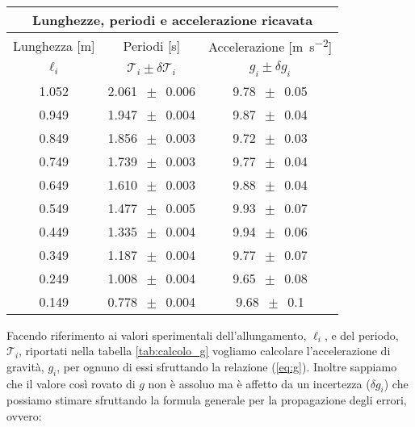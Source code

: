 \begin{SCtable}
    \centering
    \begin{tabular}{c c c}
        \multicolumn{3}{c}{\textbf{Lunghezze, periodi e accelerazione ricavata}} \\
        \toprule
        Lunghezza [\si{\metre}] & Periodi [\si{\second}] & Accelerazione [\si{\metre\per\square\second}] \\ %
        $\ell_i$ & $\mathcal{T}_i \pm \delta\mathcal{T}_i$ & $g_i \pm \delta g_i$ \\
        \midrule
			1.052 & 2.061 $\,\pm\,$ 0.006 & 9.78 $\,\pm\,$ 0.05 \\
			0.949 & 1.947 $\,\pm\,$ 0.004 & 9.87 $\,\pm\,$ 0.04 \\
			0.849 & 1.856 $\,\pm\,$ 0.003 & 9.72 $\,\pm\,$ 0.03 \\
			0.749 & 1.739 $\,\pm\,$ 0.003 & 9.77 $\,\pm\,$ 0.04 \\
			0.649 & 1.610 $\,\pm\,$ 0.003 & 9.88 $\,\pm\,$ 0.04 \\
			0.549 & 1.477 $\,\pm\,$ 0.005 & 9.93 $\,\pm\,$ 0.07 \\
			0.449 & 1.335 $\,\pm\,$ 0.004 & 9.94 $\,\pm\,$ 0.06 \\
			0.349 & 1.187 $\,\pm\,$ 0.004 & 9.77 $\,\pm\,$ 0.07 \\
			0.249 & 1.008 $\,\pm\,$ 0.004 & 9.65 $\,\pm\,$ 0.08 \\
			0.149 & 0.778 $\,\pm\,$ 0.004 & 9.68 $\,\pm\,$ 0.1 \\
        \bottomrule
    \end{tabular}
    \caption{In questa tebella sono riportate nella prima colonna le misure della lunghezza del filo che sono tutte affette da un'incertezza di 0.0006 m ricavata nel paragrafo precedente al punto \ref{l_medie}. Nella seconda colonna sono riportati i valori medi del periodo di oscillazione del pendolo relativo a ciascuna lunghezza. Infine nella terza colonna sono riportati i valori di $g_i$ derivanti dai dati grazie all'equazione (\ref{eq:g}) e (\ref{eq:delta_g}). Per maggiori informazioni sulle prime due colonne si faccia riferimento alla tabella \ref{tab:l_dati}, che commenta anche l'origine delle misure e la loro incertezza.}
    \label{tab:calcolo_g}
\end{SCtable}

Facendo riferimento ai valori sperimentali dell'allungamento, $\ell_i$, e del periodo, $\mathcal{T}_i$, riportati nella tabella \ref{tab:calcolo_g} vogliamo calcolare l'accelerazione di gravità, $g_i$, per ognuno di essi sfruttando la relazione (\ref{eq:g}). Inoltre sappiamo che il valore così rovato di $g$ non è assoluo ma è affetto da un incertezza ($\delta g_i$) che possiamo stimare sfruttando la formula generale per la propagazione degli errori, ovvero:

